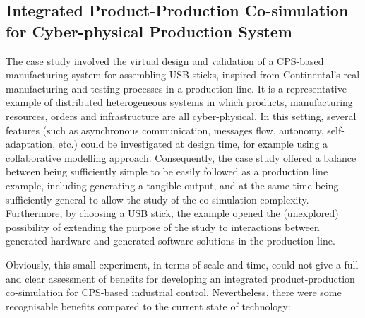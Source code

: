 \subsection{Integrated Product-Production Co-simulation for Cyber-physical Production System} \label{sec:IPP4CPPS}

The case study involved the virtual design and validation of a CPS-based manufacturing system for assembling USB sticks, inspired from Continental's real manufacturing and testing processes in a production line. It is a representative example of distributed heterogeneous systems in which products, manufacturing resources, orders and infrastructure are all cyber-physical. In this setting, several features (such as asynchronous communication, messages flow, autonomy, self-adaptation, etc.) could be investigated at design time, for example using a collaborative modelling approach. Consequently, the case study offered a balance between being sufficiently simple to be easily followed as a production line example, including generating a tangible output, and at the same time being sufficiently general to allow the study of the co-simulation complexity. Furthermore, by choosing a USB stick, the example opened the (unexplored) possibility of extending the purpose of the study to interactions between generated hardware and generated software solutions in the production line.

Obviously, this small experiment, in terms of scale and time, could not give a full and clear assessment of benefits for developing an integrated product-production co-simulation for CPS-based industrial control. Nevertheless, there were some recognisable benefits compared to the current state of technology:

